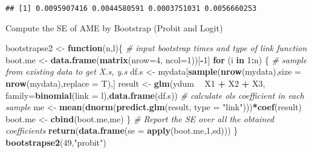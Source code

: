 \documentclass[]{article}
\newenvironment{Shaded}{\begin{snugshade}}{\end{snugshade}}
\newcommand{\KeywordTok}[1]{\textcolor[rgb]{0.13,0.29,0.53}{\textbf{#1}}}
\newcommand{\DataTypeTok}[1]{\textcolor[rgb]{0.13,0.29,0.53}{#1}}
\newcommand{\DecValTok}[1]{\textcolor[rgb]{0.00,0.00,0.81}{#1}}
\newcommand{\StringTok}[1]{\textcolor[rgb]{0.31,0.60,0.02}{#1}}
\newcommand{\CommentTok}[1]{\textcolor[rgb]{0.56,0.35,0.01}{\textit{#1}}}
\newcommand{\ControlFlowTok}[1]{\textcolor[rgb]{0.13,0.29,0.53}{\textbf{#1}}}
\newcommand{\OperatorTok}[1]{\textcolor[rgb]{0.81,0.36,0.00}{\textbf{#1}}}
\newcommand{\NormalTok}[1]{#1}
\begin{document}
\begin{Shaded}
\end{Shaded}

\begin{verbatim}
## [1] 0.0095907416 0.0044580591 0.0003751031 0.0056660253
\end{verbatim}

Compute the SE of AME by Bootstrap (Probit and Logit)

\begin{Shaded}
\begin{Highlighting}[]
\NormalTok{bootstrapse2 <-}\StringTok{ }\ControlFlowTok{function}\NormalTok{(n,l)\{}
  \CommentTok{# input bootstrap times and type of link function}
\NormalTok{  boot.me <-}\StringTok{ }\KeywordTok{data.frame}\NormalTok{(}\KeywordTok{matrix}\NormalTok{(}\DataTypeTok{nrow=}\DecValTok{4}\NormalTok{, }\DataTypeTok{ncol=}\DecValTok{1}\NormalTok{))[}\OperatorTok{-}\DecValTok{1}\NormalTok{]}
  \ControlFlowTok{for}\NormalTok{ (i }\ControlFlowTok{in} \DecValTok{1}\OperatorTok{:}\NormalTok{n) \{}
    \CommentTok{# sample from existing data to get X.s, y.s}
\NormalTok{    df.s <-}\StringTok{ }\NormalTok{mydata[}\KeywordTok{sample}\NormalTok{(}\KeywordTok{nrow}\NormalTok{(mydata),}\DataTypeTok{size =} \KeywordTok{nrow}\NormalTok{(mydata),}\DataTypeTok{replace =}\NormalTok{ T),]}
\NormalTok{    result <-}\StringTok{ }\KeywordTok{glm}\NormalTok{(ydum }\OperatorTok{~}\StringTok{ }\NormalTok{X1 }\OperatorTok{+}\StringTok{ }\NormalTok{X2 }\OperatorTok{+}\StringTok{ }\NormalTok{X3, }\DataTypeTok{family=}\KeywordTok{binomial}\NormalTok{(}\DataTypeTok{link =}\NormalTok{ l),}\KeywordTok{data.frame}\NormalTok{(df.s))}
    \CommentTok{# calculate ols coefficient in each sample}
\NormalTok{    me <-}\StringTok{ }\KeywordTok{mean}\NormalTok{(}\KeywordTok{dnorm}\NormalTok{(}\KeywordTok{predict.glm}\NormalTok{(result, }\DataTypeTok{type =} \StringTok{"link"}\NormalTok{)))}\OperatorTok{*}\KeywordTok{coef}\NormalTok{(result)}
\NormalTok{    boot.me <-}\StringTok{ }\KeywordTok{cbind}\NormalTok{(boot.me,me)}
\NormalTok{  \}}
  \CommentTok{# Report the SE over all the obtained coefficients}
  \KeywordTok{return}\NormalTok{(}\KeywordTok{data.frame}\NormalTok{(}\DataTypeTok{se =} \KeywordTok{apply}\NormalTok{(boot.me,}\DecValTok{1}\NormalTok{,sd)))}
\NormalTok{\}}
\KeywordTok{bootstrapse2}\NormalTok{(}\DecValTok{49}\NormalTok{,}\StringTok{"probit"}\NormalTok{)}
\end{Highlighting}
\end{Shaded}
\end{document}

